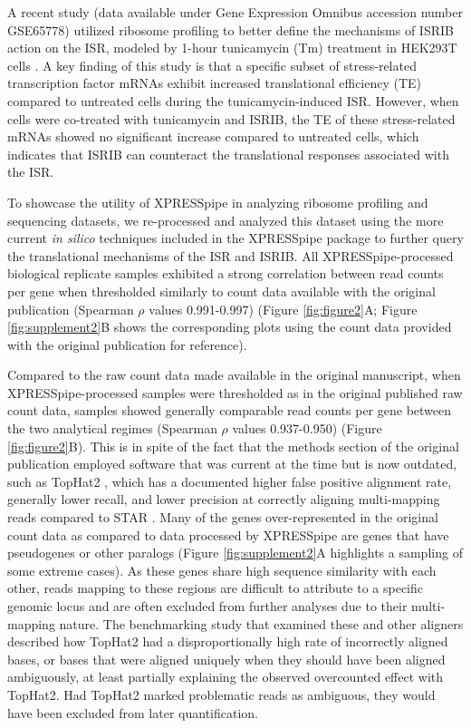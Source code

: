 \documentclass[10pt, oneside]{article}
\begin{document}
\begin{multicols}{2}
A recent study (data available under Gene Expression Omnibus accession number GSE65778) utilized ribosome profiling to better define the mechanisms of ISRIB action on the ISR, modeled by 1-hour tunicamycin (Tm) treatment in HEK293T cells \cite{isrib_riboseq}. A key finding of this study is that a specific subset of stress-related transcription factor mRNAs exhibit increased translational efficiency (TE) compared to untreated cells during the tunicamycin-induced ISR. However, when cells were co-treated with tunicamycin and ISRIB, the TE of these stress-related mRNAs showed no significant increase compared to untreated cells, which indicates that ISRIB can counteract the translational responses associated with the ISR. \par

To showcase the utility of XPRESSpipe in analyzing ribosome profiling and sequencing datasets, we re-processed and analyzed this dataset using the more current \textit{in silico} techniques included in the XPRESSpipe package to further query the translational mechanisms of the ISR and ISRIB. All XPRESSpipe-processed biological replicate samples exhibited a strong correlation between read counts per gene when thresholded similarly to count data available with the original publication (Spearman $\rho$ values 0.991-0.997) (Figure \ref{fig:figure2}A; Figure \ref{fig:supplement2}B shows the corresponding plots using the count data provided with the original publication for reference). \par

Compared to the raw count data made available in the original manuscript, when XPRESSpipe-processed samples were thresholded as in the original published raw count data, samples showed generally comparable read counts per gene between the two analytical regimes (Spearman $\rho$ values 0.937-0.950) (Figure \ref{fig:figure2}B). This is in spite of the fact that the methods section of the original publication employed software that was current at the time but is now outdated, such as TopHat2 \cite{tophat2}, which has a documented higher false positive alignment rate, generally lower recall, and lower precision at correctly aligning multi-mapping reads compared to STAR \cite{alignment_benchmark, star}. Many of the genes over-represented in the original count data as compared to data processed by XPRESSpipe are genes that have pseudogenes or other paralogs (Figure \ref{fig:supplement2}A highlights a sampling of some extreme cases). As these genes share high sequence similarity with each other, reads mapping to these regions are difficult to attribute to a specific genomic locus and are often excluded from further analyses due to their multi-mapping nature. The benchmarking study \cite{alignment_benchmark} that examined these and other aligners described how TopHat2 had a disproportionally high rate of incorrectly aligned bases, or bases that were aligned uniquely when they should have been aligned ambiguously, at least partially explaining the observed overcounted effect with TopHat2. Had TopHat2 marked problematic reads as ambiguous, they would have been excluded from later quantification. \par


\end{multicols}
\end{document}
